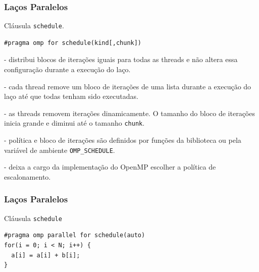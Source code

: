 \documentclass[xcolor={usenames,dvipsnames},12pt,presentation,aspectratio=169]{beamer}
\begin{document}
\begin{frame}[fragile]
  \frametitle{Laços Paralelos}
Cláusula \texttt{schedule}.
%
\begin{minipage}{0.95\textwidth}  
\begin{verbatim}
#pragma omp for schedule(kind[,chunk])
\end{verbatim}
\end{minipage}
  \pause
\begin{description}[<+->]
\item[static] - distribui blocos de iterações iguais para todas as threads e
não altera essa configuração durante a execução do laço.

\item[dynamic] - cada thread remove um bloco de iterações de uma lista durante
a execução do laço até que todas tenham sido executadas.

\item[guided] - as threads removem iterações dinamicamente. O tamanho do bloco
de iterações inicia grande e diminui até o tamanho \texttt{chunk}.

\item[runtime] - política e bloco de iterações são definidos por funções da
biblioteca ou pela variável de ambiente \texttt{OMP_SCHEDULE}.

\item[auto] - deixa a cargo da implementação do OpenMP escolher a política de
escalonamento.
\end{description}
\end{frame}
\begin{frame}[fragile]
  \frametitle{Laços Paralelos}
Cláusula \texttt{schedule}
\begin{minipage}{0.95\textwidth}  
\begin{verbatim}
#pragma omp parallel for schedule(auto)
for(i = 0; i < N; i++) {
  a[i] = a[i] + b[i];
}
\end{verbatim}
\end{minipage}
\end{frame}
\end{document}
